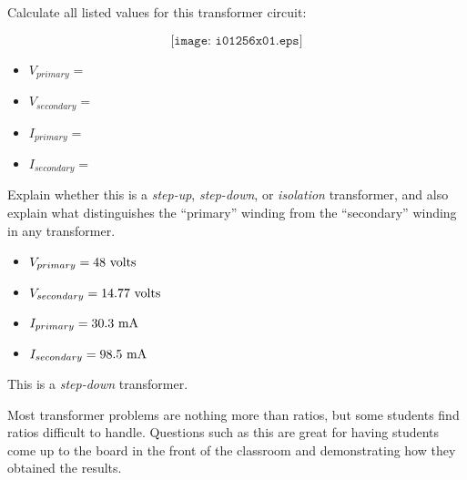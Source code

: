 

Calculate all listed values for this transformer circuit:

$$\texttt{[image: i01256x01.eps]}$$

\begin{itemize}
\item{} $V_{primary} = $
\item{} $V_{secondary} = $
\item{} $I_{primary} = $
\item{} $I_{secondary} = $
\end{itemize}

Explain whether this is a {\it step-up}, {\it step-down}, or {\it isolation} transformer, and also explain what distinguishes the ``primary'' winding from the ``secondary'' winding in any transformer.







\begin{itemize}
\item{} $V_{primary} = 48 \hbox{ volts}$
\item{} $V_{secondary} = 14.77 \hbox{ volts}$
\item{} $I_{primary} = 30.3 \hbox{ mA}$
\item{} $I_{secondary} = 98.5 \hbox{ mA}$
\end{itemize}

This is a {\it step-down} transformer.







Most transformer problems are nothing more than ratios, but some students find ratios difficult to handle.  Questions such as this are great for having students come up to the board in the front of the classroom and demonstrating how they obtained the results.




